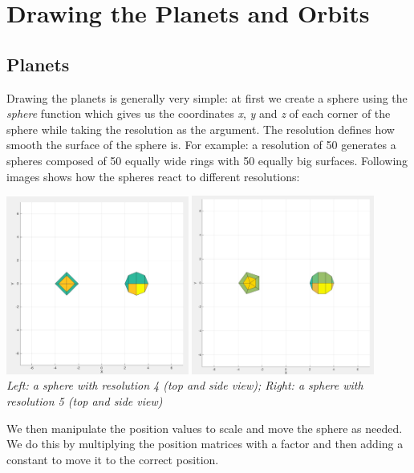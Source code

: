\chapter{Drawing the Planets and Orbits}
\section{Planets}
Drawing the planets is generally very simple: at first we create a sphere using the {\em sphere} function which gives us the coordinates {\em x}, {\em y} and {\em z} of each corner of the sphere while taking the  resolution as the argument. The resolution defines how smooth the surface of the sphere is. For example: a resolution of 50 generates a spheres composed of 50 equally wide rings with 50 equally big surfaces. Following images shows how the spheres react to different resolutions:

\begin{center}
\includegraphics[width=0.45\textwidth]{imgs/drawing_planets_orbits/spheres_res4.jpg}
\includegraphics[width=0.45\textwidth]{imgs/drawing_planets_orbits/spheres_res5.jpg}\\
\textit{Left: a sphere with resolution 4 (top and side view); Right: a sphere with resolution 5 (top and side view)}
\end{center}

We then manipulate the position values to scale and move the sphere as needed. We do this by multiplying the position matrices with a factor and then adding a constant to move it to the correct position.\\


